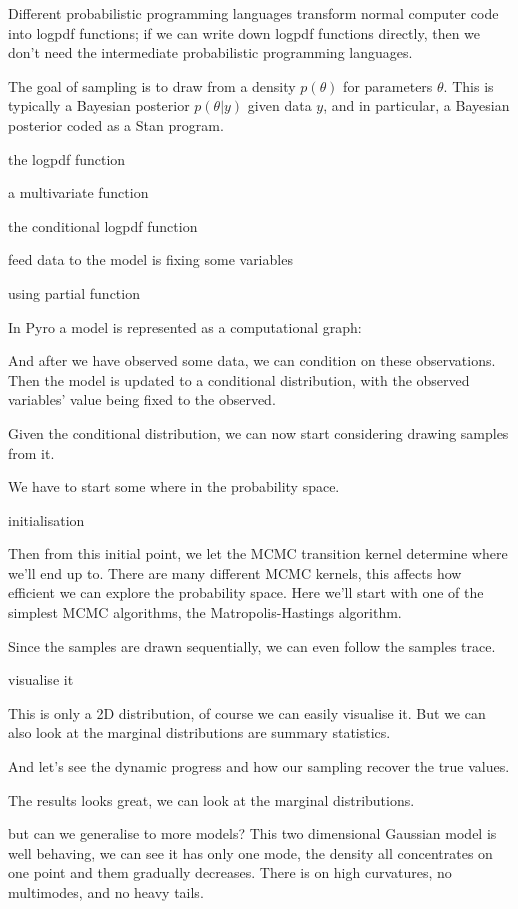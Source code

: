 \documentclass[11pt]{article}
\begin{document}
Different probabilistic programming languages transform normal computer
code into logpdf functions; if we can write down logpdf functions
directly, then we don't need the intermediate probabilistic programming
languages.

The goal of sampling is to draw from a density \(p(\theta)\) for
parameters \(\theta\). This is typically a Bayesian posterior
\(p(\theta|y)\) given data \(y\), and in particular, a Bayesian posterior
coded as a Stan program.

the logpdf function

a multivariate function

the conditional logpdf function

feed data to the model is fixing some variables

using partial function

In Pyro a model is represented as a computational graph:

And after we have observed some data, we can condition on these
observations. Then the model is updated to a conditional distribution,
with the observed variables' value being fixed to the observed.

Given the conditional distribution, we can now start considering drawing
samples from it.

We have to start some where in the probability space.

initialisation

Then from this initial point, we let the MCMC transition kernel
determine where we'll end up to. There are many different MCMC kernels,
this affects how efficient we can explore the probability space. Here
we'll start with one of the simplest MCMC algorithms, the
Matropolis-Hastings algorithm.

Since the samples are drawn sequentially, we can even follow the samples
trace.

visualise it

This is only a 2D distribution, of course we can easily visualise it.
But we can also look at the marginal distributions are summary
statistics.

And let's see the dynamic progress and how our sampling recover the true
values.

The results looks great, we can look at the marginal distributions.

but can we generalise to more models? This two dimensional Gaussian
model is well behaving, we can see it has only one mode, the density all
concentrates on one point and them gradually decreases. There is on high
curvatures, no multimodes, and no heavy tails.
\end{document}
